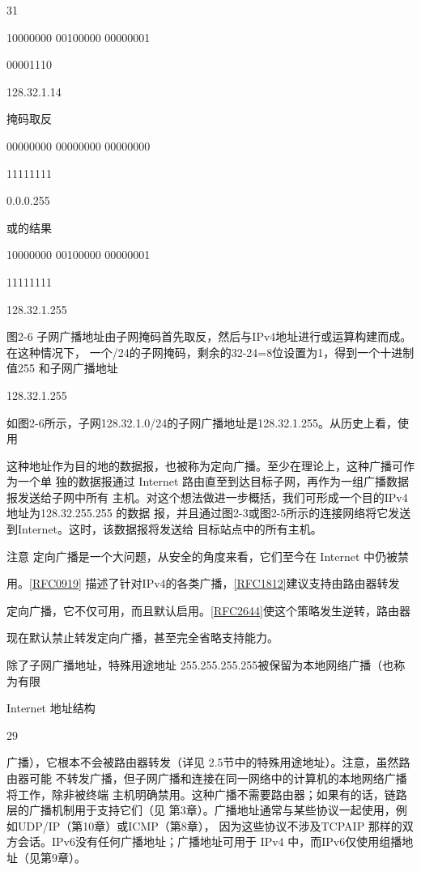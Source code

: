 31

10000000 00100000 00000001

00001110

128.32.1.14

掩码取反

00000000 00000000 00000000

11111111

0.0.0.255

或的结果

10000000 00100000 00000001

11111111

128.32.1.255

图2-6 子网广播地址由子网掩码首先取反，然后与IPv4地址进行或运算构建而成。在这种情况下，
一个/24的子网掩码，剩余的32-24=8位设置为1，得到一个十进制值255 和子网广播地址

128.32.1.255

如图2-6所示，子网128.32.1.0/24的子网广播地址是128.32.1.255。从历史上看，使用

这种地址作为目的地的数据报，也被称为定向广播。至少在理论上，这种广播可作为一个单
独的数据报通过 Internet 路由直至到达目标子网，再作为一组广播数据报发送给子网中所有
主机。对这个想法做进一步概括，我们可形成一个目的IPv4 地址为128.32.255.255 的数据
报，并且通过图2-3或图2-5所示的连接网络将它发送到Internet。这时，该数据报将发送给
目标站点中的所有主机。

注意 定向广播是一个大问题，从安全的角度来看，它们至今在 Internet 中仍被禁

用。\href{https://www.rfc-editor.org/rfc/rfc0919}{[RFC0919]} 描述了针对IPv4的各类广播，\href{https://www.rfc-editor.org/rfc/rfc1812}{[RFC1812]}建议支持由路由器转发

定向广播，它不仅可用，而且默认启用。\href{https://www.rfc-editor.org/rfc/rfc2644}{[RFC2644]}使这个策略发生逆转，路由器

现在默认禁止转发定向广播，甚至完全省略支持能力。

除了子网广播地址，特殊用途地址 255.255.255.255被保留为本地网络广播（也称为有限

Internet 地址结构

29

广播），它根本不会被路由器转发（详见 2.5节中的特殊用途地址）。注意，虽然路由器可能
不转发广播，但子网广播和连接在同一网络中的计算机的本地网络广播将工作，除非被终端
主机明确禁用。这种广播不需要路由器；如果有的话，链路层的广播机制用于支持它们（见
第3章）。广播地址通常与某些协议一起使用，例如UDP/IP（第10章）或ICMP（第8章），
因为这些协议不涉及TCPAIP 那样的双方会话。IPv6没有任何广播地址；广播地址可用于
IPv4 中，而IPv6仅使用组播地址（见第9章）。

